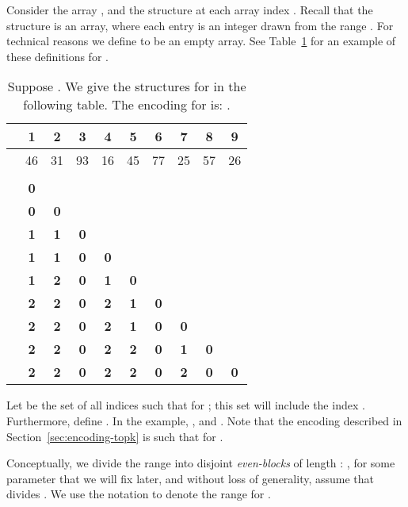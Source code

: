 \documentclass[runningheads]{llncs}
\begin{document}
Consider the array , and the structure  at each array index
.  Recall that the structure  is an array, where
each entry is an integer drawn from the range .  For technical
reasons we define  to be an empty array.  See
Table~\ref{tab:twoseq} for an example of these definitions for .

\begin{table}
\centering
\caption{\label{tab:twoseq}Suppose .  We give the structures  for  in the following
  table. The encoding for  is: .}
\begin{tabular}{|r||c|c|c|c|c|c|c|c|c|}
\hline 
    & 1 & 2 & 3 & 4 & 5 & 6 & 7 & 8 & 9 \\
\hline
    & 46 & 31 & 93 & 16 & 45 & 77 & 25 & 57 & 26 \\
\hline
\hline
   &  &   &   &   &   &   &   &   &    \\
\hline 
   & {\bf 0} &   &   &   &   &   &   &   &    \\
\hline 
   & {\bf 0} & {\bf 0} &   &   &   &   &   &   &    \\
\hline 
   & {\bf 1} & {\bf 1} & {\bf 0} &   &   &   &   &   &    \\
\hline 
   & {\bf 1} & {\bf 1} & {\bf 0} & {\bf 0} &   &   &   &   &    \\
\hline 
   & {\bf 1} & {\bf 2} & {\bf 0} & {\bf 1} & {\bf 0} &   &   &   &    \\
\hline 
   & {\bf 2} & {\bf 2} & {\bf 0} & {\bf 2} & {\bf 1} & {\bf 0} &   &   &    \\
\hline 
   & {\bf 2} & {\bf 2} & {\bf 0} & {\bf 2} & {\bf 1} & {\bf 0} & {\bf 0} &   &    \\
\hline 
   & {\bf 2} & {\bf 2} & {\bf 0} & {\bf 2} & {\bf 2} & {\bf 0} & {\bf 1} & {\bf 0} &    \\
\hline 
   & {\bf 2} & {\bf 2} & {\bf 0} & {\bf 2} & {\bf 2} & {\bf 0} & {\bf 2} & {\bf 0} & {\bf 0}  \\ 
\hline
\end{tabular}
\end{table}


Let  be the set of all indices such
that  for ; this
set will include the index .  Furthermore, define .  In the example, , and .  Note that the encoding
described in Section~\ref{sec:encoding-topk} is such that  for .

Conceptually, we divide the range  into disjoint
\emph{even-blocks} of length : , for some
parameter  that we will fix later, and without loss of
generality, assume that  divides .  We use the notation
 to denote the range  for .
\end{document}
